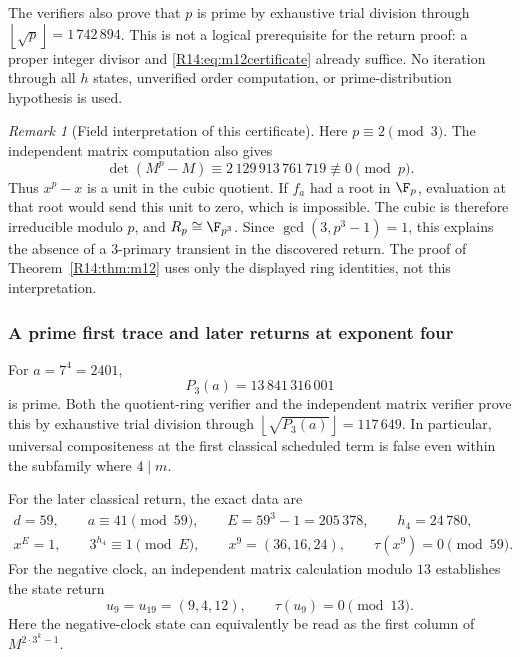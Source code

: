 \documentclass[11pt,a4paper]{article}
\theoremstyle{definition}\newtheorem{definition}[theorem]{Definition}
\theoremstyle{remark}\newtheorem{remark}[theorem]{Remark}
\newcommand{\floor}[1]{\left\lfloor#1\right\rfloor}
\begin{document}
The verifiers also prove that $p$ is prime by exhaustive trial
division through $\floor{\sqrt p}=1\,742\,894$. This is not a
logical prerequisite for the return proof: a proper integer divisor
and \eqref{R14:eq:m12certificate} already suffice. No iteration through
all $h$ states, unverified order computation, or prime-distribution
hypothesis is used.

\begin{remark}[Field interpretation of this certificate]
Here $p\equiv2\pmod3$. The independent matrix computation also gives
\[
 \det(M^p-M)\equiv2\,129\,913\,761\,719\not\equiv0\pmod p.
\]
Thus $x^p-x$ is a unit in the cubic quotient. If $f_a$ had a root
in $\F_p$, evaluation at that root would send this unit to zero,
which is impossible. The cubic is therefore irreducible modulo
$p$, and $R_p\cong\F_{p^3}$. Since $\gcd(3,p^3-1)=1$, this
explains the absence of a $3$-primary transient in the discovered
return. The proof of Theorem~\ref{R14:thm:m12} uses only the displayed
ring identities, not this interpretation.
\end{remark}

\subsubsection{A prime first trace and later returns at exponent four}

For $a=7^4=2401$,
\begin{equation}\label{R14:eq:m4prime}
 P_3(a)=13\,841\,316\,001
\end{equation}
is prime. Both the quotient-ring verifier and the independent matrix
verifier prove this by exhaustive trial division through
$\floor{\sqrt{P_3(a)}}=117\,649$. In particular, universal
compositeness at the first classical scheduled term is false even
within the subfamily where $4\mid m$.

For the later classical return, the exact data are
\begin{equation}\label{R14:eq:m4certificate}
 \begin{gathered}
 d=59,\qquad a\equiv41\pmod{59},\qquad
 E=59^3-1=205\,378,\qquad h_4=24\,780,\\
 x^E=1,\qquad 3^{h_4}\equiv1\pmod E,\qquad
 x^9=(36,16,24),\qquad\tau(x^9)=0\pmod{59}.
 \end{gathered}
\end{equation}
For the negative clock, an independent matrix calculation modulo
$13$ establishes the state return
\begin{equation}\label{R14:eq:m4negative}
 u_9=u_{19}=(9,4,12),\qquad\tau(u_9)=0\pmod{13}.
\end{equation}
Here the negative-clock state can equivalently be read as the first
column of $M^{2\cdot3^k-1}$.
\end{document}
